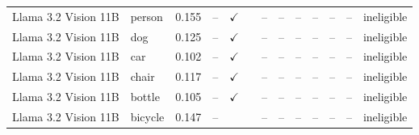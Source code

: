 \begin{longtable}{llrrccrrrrrll}
Llama 3.2 Vision 11B & person & 0.155 & -- & $\checkmark$ & & -- & -- & -- & -- & -- & -- & ineligible \\
Llama 3.2 Vision 11B & dog & 0.125 & -- & $\checkmark$ & & -- & -- & -- & -- & -- & -- & ineligible \\
Llama 3.2 Vision 11B & car & 0.102 & -- & $\checkmark$ & & -- & -- & -- & -- & -- & -- & ineligible \\
Llama 3.2 Vision 11B & chair & 0.117 & -- & $\checkmark$ & & -- & -- & -- & -- & -- & -- & ineligible \\
Llama 3.2 Vision 11B & bottle & 0.105 & -- & $\checkmark$ & & -- & -- & -- & -- & -- & -- & ineligible \\
Llama 3.2 Vision 11B & bicycle & 0.147 & -- &  & & -- & -- & -- & -- & -- & -- & ineligible \\
\end{longtable}
\normalsize
